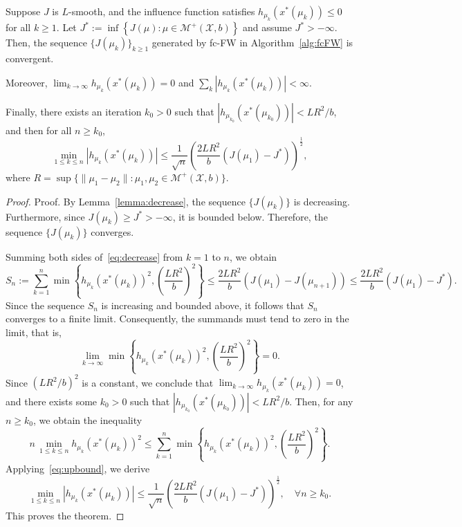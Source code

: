 \documentclass[stsy,sglanonrev]{informs4}
\begin{document}
\begin{theorem}[Convergence of fc-FW]\label{thm:convfcFW}  
Suppose \( J \) is \( L \)-smooth, and the influence function satisfies \( h_{\mu_k}(x^*(\mu_k)) \leq 0 \) for all \( k \geq 1 \). Let $J^* := \inf\left\{J(\mu) : \mu \in \mathcal{M}^+(\mathcal{X},b)\right\}$ 
and assume \( J^* > -\infty \). Then, the sequence \( \{J(\mu_k)\}_{k \geq 1} \) generated by fc-FW in Algorithm~\ref{alg:fcFW} is convergent.

Moreover, $\lim_{k \to \infty} h_{\mu_k} (x^*(\mu_k)) = 0$ and $\sum_k |h_{\mu_k}(x^*(\mu_k))| < \infty$.

Finally, there exists an iteration \( k_0 > 0 \) such that \( \left| h_{\mu_{k_0}} (x^*(\mu_{k_0})) \right| < LR^2/b \), and then for all \( n \geq k_0 \),
\begin{equation}
    \min_{1 \leq k \leq n} \left| h_{\mu_k} (x^*(\mu_k)) \right| \leq \frac{1}{\sqrt{n}} \left( \frac{2 L R^2}{b} (J(\mu_1) - J^*) \right)^{\frac{1}{2}},
\end{equation}  
where \(R = \sup\{\|\mu_1-\mu_2\| : \mu_1, \mu_2 \in \mathcal{M}^+(\mathcal{X},b)\}.\) 
\end{theorem}
\begin{proof}{Proof.}
By Lemma~\ref{lemma:decrease}, the sequence \( \{ J(\mu_k) \} \) is decreasing. Furthermore, since \( J(\mu_k) \geq J^* > -\infty \), it is bounded below. Therefore, the sequence \( \{ J(\mu_k) \} \) converges.

Summing both sides of~\eqref{eq:decrease} from \( k=1 \) to \( n \), we obtain
\begin{equation}\label{eq:upbound}
    S_n:=\sum_{k=1}^{n} \min \left\{ h_{\mu_k} (x^*(\mu_k))^2, \left(\frac{LR^2}{b}\right)^2 \right\} 
    \leq \frac{2 L R^2}{b} (J(\mu_1) - J(\mu_{n+1})) 
    \leq \frac{2 L R^2}{b} (J(\mu_1) - J^*).
\end{equation}
Since the sequence \(S_n\)
is increasing and bounded above, it follows that \( S_n \) converges to a finite limit. Consequently, the summands must tend to zero in the limit, that is,
\begin{equation*}
    \lim_{k \to \infty} \min \left\{ h_{\mu_k} (x^*(\mu_k))^2, \left(\frac{LR^2}{b}\right)^2 \right\} = 0.
\end{equation*}
Since \( (LR^2/b)^2 \) is a constant, we conclude that $\lim_{k \to \infty} h_{\mu_k} (x^*(\mu_k)) = 0$,
and there exists some \( k_0 > 0 \) such that \( \left| h_{\mu_{k_0}} (x^*(\mu_{k_0})) \right| < LR^2 / b\). Then, for any \( n \geq k_0 \), we obtain the inequality
\begin{equation*}
    n \, \min_{1 \leq k \leq n} h_{\mu_k} (x^*(\mu_k))^2 
    \leq \sum_{k=1}^{n} \min \left\{ h_{\mu_k} (x^*(\mu_k))^2, \left(\frac{LR^2}{b}\right)^2 \right\}.
\end{equation*}
Applying~\eqref{eq:upbound}, we derive
\begin{equation*}
    \min_{1 \leq k \leq n} \left| h_{\mu_k} (x^*(\mu_k)) \right| 
    \leq \frac{1}{\sqrt{n}} \left( \frac{2 L R^2}{b} (J(\mu_1) - J^*) \right)^{\frac{1}{2}}, \quad \forall n \geq k_0.
\end{equation*}
This proves the theorem. \hfill \Halmos
\end{proof}
\end{document}

